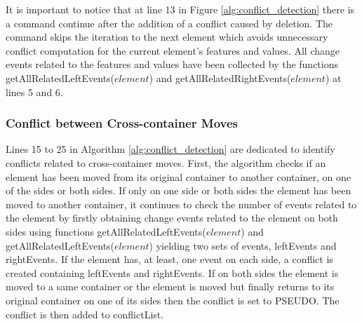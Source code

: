 It is important to notice that at line 13 in Figure \ref{alg:conflict_detection} there is a command \textsf{continue} after the addition of a conflict caused by deletion. The command skips the iteration to the next element which avoids unnecessary conflict computation for the current element's  features and values. All change events related to the features and values have been collected by the functions \textsf{getAllRelatedLeftEvents($element$)} and \textsf{getAllRelatedRightEvents($element$)} at lines 5 and 6.  

\subsubsection{Conflict between Cross-container Moves} 
\label{sec:move_conflict} 
Lines 15 to 25 in Algorithm \ref{alg:conflict_detection} are dedicated to identify conflicts related to cross-container moves. 
First, the algorithm checks if an element has been moved from its original container to another container, on one of the sides or both sides. 
If only on one side or both sides the element has been moved to another container, 
it continues to check the number of events related to the element by firstly obtaining change events related to the element on 
both sides using functions \textsf{getAllRelatedLeftEvents($element$)} and \textsf{getAllRelatedLeftEvents($element$)} yielding two sets of events, 
\textsf{leftEvents} and \textsf{rightEvents}. If the element has, at least, one event on each side,
a conflict is created containing \textsf{leftEvents} and \textsf{rightEvents}. 
If on both sides the element is moved to a same container or the element is moved but finally returns to its original container on one of its sides then the conflict is set to \textsf{PSEUDO}. The conflict is then added to \textsf{conflictList}. 

